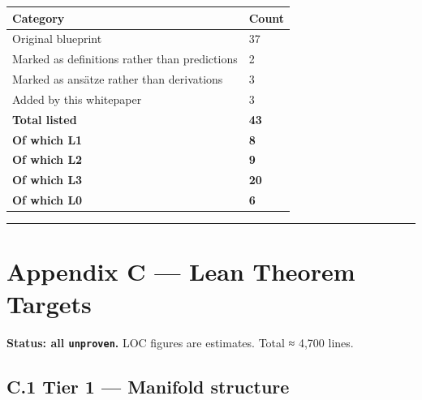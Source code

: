 \documentclass[
  11pt]{report}
\begin{document}
\begin{longtable}[]{@{}ll@{}}
\toprule\noalign{}
Category & Count \\
\midrule\noalign{}
\endhead
\bottomrule\noalign{}
\endlastfoot
Original blueprint & 37 \\
Marked as definitions rather than predictions & 2 \\
Marked as ansätze rather than derivations & 3 \\
Added by this whitepaper & 3 \\
\textbf{Total listed} & \textbf{43} \\
\textbf{Of which L1} & \textbf{8} \\
\textbf{Of which L2} & \textbf{9} \\
\textbf{Of which L3} & \textbf{20} \\
\textbf{Of which L0} & \textbf{6} \\
\end{longtable}

\begin{center}\rule{0.5\linewidth}{0.5pt}\end{center}

\hypertarget{appendix-c-lean-theorem-targets}{%
\chapter{Appendix C --- Lean Theorem
Targets}\label{appendix-c-lean-theorem-targets}}

\textbf{Status: all \texttt{unproven}.} LOC figures are estimates. Total
≈ 4,700 lines.

\hypertarget{c.1-tier-1-manifold-structure}{%
\section{C.1 Tier 1 --- Manifold
structure}\label{c.1-tier-1-manifold-structure}}
\end{document}
